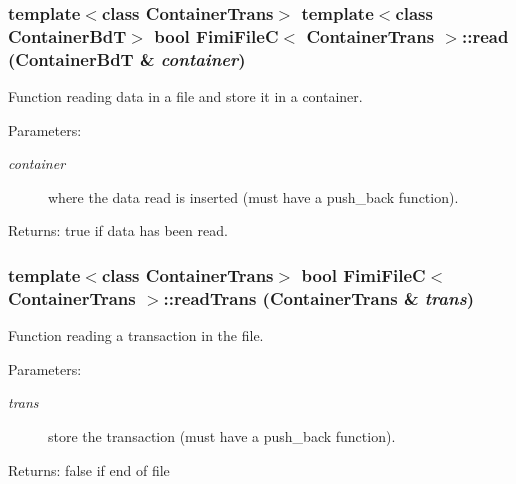 \subsubsection{\setlength{\rightskip}{0pt plus 5cm}template$<$class Container\-Trans$>$ template$<$class Container\-Bd\-T$>$ bool {\bf Fimi\-File\-C}$<$ Container\-Trans $>$::read (Container\-Bd\-T \& {\em container})\hspace{0.3cm}{\tt  [protected]}}\label{class_fimi_file_c_ad3bef9b9b14a17a2847d2ea841f979b}


Function reading data in a file and store it in a container. 

\begin{Desc}
\item[Parameters:]
\begin{description}
\item[{\em container}]where the data read is inserted (must have a push\_\-back function). \end{description}
\end{Desc}
\begin{Desc}
\item[Returns:]true if data has been read. \end{Desc}
\subsubsection{\setlength{\rightskip}{0pt plus 5cm}template$<$class Container\-Trans$>$ bool {\bf Fimi\-File\-C}$<$ Container\-Trans $>$::read\-Trans (Container\-Trans \& {\em trans})\hspace{0.3cm}{\tt  [protected]}}\label{class_fimi_file_c_ebf628a14075ccb4defbe63fa8f1b9cf}


Function reading a transaction in the file. 

\begin{Desc}
\item[Parameters:]
\begin{description}
\item[{\em trans}]store the transaction (must have a push\_\-back function). \end{description}
\end{Desc}
\begin{Desc}
\item[Returns:]false if end of file \end{Desc}
